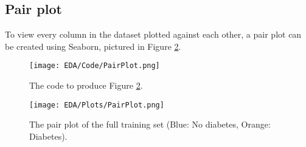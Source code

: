 \subsection{Pair plot}
To view every column in the dataset plotted against each other, a pair plot can be created using Seaborn,
pictured in Figure \ref{fig:PairPlot}.

\begin{figure}[H]
    \centering
    \texttt{[image: EDA/Code/PairPlot.png]}
    \caption{The code to produce Figure \ref{fig:PairPlot}.}
    \label{fig:PairPlotCode}
\end{figure}

\begin{figure}[H]
    \centering
    \texttt{[image: EDA/Plots/PairPlot.png]}
    \caption{The pair plot of the full training set (Blue: No diabetes, Orange: Diabetes).}
    \label{fig:PairPlot}
\end{figure}

